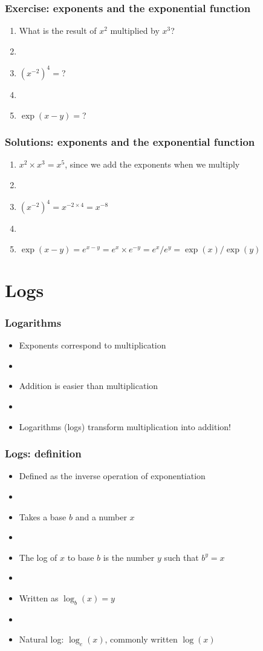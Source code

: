\documentclass[12pt]{beamer}
\newcommand{\myframe}[1]{\begin{frame} \frametitle{#1}}
\begin{document}
\myframe{Exercise: exponents and the exponential function}
\begin{enumerate}
\item What is the result of $x^2$ multiplied by $x^3$?
\item[]
\item $(x^{-2})^4 = $?
\item[]
\item $\exp(x - y) = $?
\end{enumerate}
\end{frame}

\myframe{Solutions: exponents and the exponential function}
\begin{enumerate}
\item $x^2 \times x^3 = x^5$, since we add the exponents when we multiply
\item[]
\item $(x^{-2})^4 = x^{-2 \times 4} = x^{-8}$
\item[]
\item $\exp(x - y) = e^{x - y} = e^x \times e^{-y} = e^x/e^y = \exp(x)/\exp(y)$
\end{enumerate}
\end{frame}

\section{Logs}
\myframe{Logarithms}
\begin{itemize}
\item Exponents correspond to multiplication
\item[]
\item Addition is easier than multiplication
\item[]
\item Logarithms (logs) transform multiplication into addition!
\end{itemize}
\end{frame}

\myframe{Logs: definition}
\begin{itemize}
\item Defined as the inverse operation of exponentiation
\item[]
\item Takes a base $b$ and a number $x$
\item[]
\item The log of $x$ to base $b$ is the number $y$ such that $b^y = x$
\item[]
\item Written as $\log_b(x) = y$
\item[]
\item Natural log: $\log_e(x)$, commonly written $\log(x)$
\end{itemize}
\end{frame}
\end{document}
